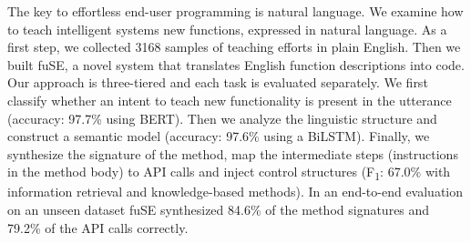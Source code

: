 The key to effortless end-user programming is natural language. We examine how to teach intelligent systems new functions, expressed in natural language. As a first step, we collected 3168 samples of teaching efforts in plain English. Then we built fuSE, a novel system that translates English function descriptions into code. Our approach is three-tiered and each task is evaluated separately. We first classify whether an intent to teach new functionality is present in the utterance (accuracy: 97.7\% using BERT). Then we analyze the linguistic structure and construct a semantic model (accuracy: 97.6\% using a BiLSTM). Finally, we synthesize the signature of the method, map the intermediate steps (instructions in the method body) to API calls and inject control structures (F\textsubscript{1}: 67.0\% with information retrieval and knowledge-based methods). In an end-to-end evaluation on an unseen dataset fuSE synthesized 84.6\% of the method signatures and 79.2\% of the API calls correctly.
